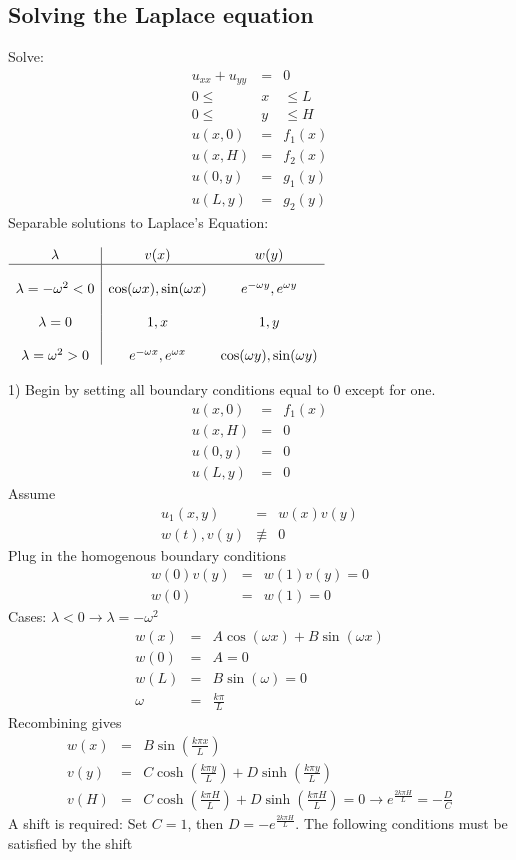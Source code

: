 \documentclass{article}
\newcommand{\bea}{\begin{eqnarray*}}
\newcommand{\eea}{\end{eqnarray*}}
\begin{document}
\subsection{Solving the Laplace equation}
Solve:
\bea
u_{xx}+u_{yy} &=& 0\\
0 \leq &x& \leq L\\
0 \leq &y& \leq H\\
u(x,0) &=& f_1(x)\\
u(x,H) &=& f_2(x)\\
u(0,y) &=& g_1(y)\\
u(L,y) &=& g_2(y)
\eea
Separable solutions to Laplace's Equation:
\begin{center}
$\begin{array}{c|c c} 
\lambda & v(x) & w(y)\\   
\hline\\
\lambda = -\omega^2<0 & \cos(\omega x),\sin(\omega x) & e^{-\omega y},e^{\omega y}\\\\
\lambda = 0 & 1, x & 1, y\\\\
\lambda = \omega^2>0 & e^{-\omega x},e^{\omega x} & \cos(\omega y),\sin(\omega y)\\
\end{array}$
\end{center}
1) Begin by setting all boundary conditions equal to $0$ except for one.
\bea
u(x,0) &=& f_1(x)\\
u(x,H) &=& 0\\
u(0,y) &=& 0\\
u(L,y) &=& 0
\eea
Assume
\bea
u_1(x,y) &=& w(x)v(y)\\
w(t),v(y) &\not \equiv& 0
\eea
Plug in the homogenous boundary conditions
\bea
w(0)v(y) &=& w(1)v(y) = 0\\
w(0) &=& w(1) = 0
\eea
Cases: $\lambda < 0 \rightarrow \lambda = -\omega^2$
\bea
w(x) &=& A\cos(\omega x) + B\sin(\omega x)\\
w(0) &=& A = 0\\
w(L) &=& B\sin(\omega) = 0\\
\omega &=& \frac{k\pi}{L}
\eea
Recombining gives
\bea
w(x) &=& B\sin\left(\frac{k\pi x}{L}\right)\\
v(y) &=& C\cosh\left(\frac{k\pi y}{L}\right) + D\sinh\left(\frac{k\pi y}{L}\right)\\
v(H) &=& C\cosh\left(\frac{k\pi H}{L}\right) + D\sinh\left(\frac{k\pi H}{L}\right) = 0 \longrightarrow e^{\frac{2k\pi H}{L}} = -\frac{D}{C}
\eea
A shift is required: Set $C=1$, then $D=-e^{\frac{2k\pi H}{L}}$. The following conditions must be satisfied by the shift
\end{document}

